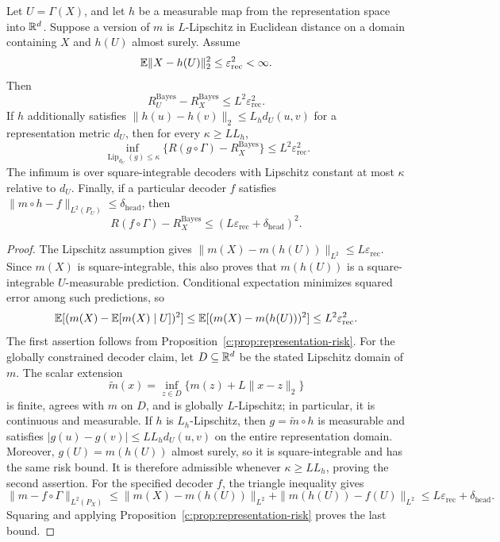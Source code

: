\begin{proposition}
\label{c:prop:reconstruction-bridge}
Let $U=\Gamma(X)$, and let $h$ be a measurable map from the representation
space into $\mathbb{R}^d$. Suppose a version of $m$ is $L$-Lipschitz in Euclidean
distance on a domain containing $X$ and $h(U)$ almost surely. Assume
\[
 \mathbb{E}\|X-h(U)\|_2^2\leq\varepsilon_{\mathrm{rec}}^2<\infty.
\]
Then
\[
 R_U^{\mathrm{Bayes}}-R_X^{\mathrm{Bayes}}
 \leq L^2\varepsilon_{\mathrm{rec}}^2.
\]
If $h$ additionally satisfies
$\|h(u)-h(v)\|_2\leq L_h d_U(u,v)$ for a representation metric $d_U$,
then for every $\kappa\geq LL_h$,
\[
 \inf_{\operatorname{Lip}_{d_U}(g)\leq\kappa}
 \{R(g\circ\Gamma)-R_X^{\mathrm{Bayes}}\}
 \leq L^2\varepsilon_{\mathrm{rec}}^2.
\]
The infimum is over square-integrable decoders with Lipschitz constant at
most $\kappa$ relative to $d_U$. Finally, if a particular decoder $f$
satisfies
$\|m\circ h-f\|_{L^2(P_U)}\leq\delta_{\mathrm{head}}$, then
\[
 R(f\circ\Gamma)-R_X^{\mathrm{Bayes}}
 \leq(L\varepsilon_{\mathrm{rec}}+\delta_{\mathrm{head}})^2.
\]
\end{proposition}
\begin{proof}
The Lipschitz assumption gives
$\|m(X)-m(h(U))\|_{L^2}\leq L\varepsilon_{\mathrm{rec}}$.
Since $m(X)$ is square-integrable, this also proves that $m(h(U))$ is
a square-integrable $U$-measurable prediction. Conditional expectation
minimizes squared error among such predictions, so
\[
 \mathbb{E}[(m(X)-\mathbb{E}[m(X)\mid U])^2]
 \leq\mathbb{E}[(m(X)-m(h(U)))^2]
 \leq L^2\varepsilon_{\mathrm{rec}}^2.
\]
The first assertion follows from
Proposition~\ref{c:prop:representation-risk}. For the globally constrained
decoder claim, let $D\subseteq\mathbb{R}^d$ be the stated Lipschitz domain of $m$.
The scalar extension
\[
 \widetilde m(x)=\inf_{z\in D}\{m(z)+L\|x-z\|_2\}
\]
is finite, agrees with $m$ on $D$, and is globally $L$-Lipschitz;
in particular, it is continuous and measurable. If $h$ is
$L_h$-Lipschitz, then $g=\widetilde m\circ h$ is measurable and satisfies
$|g(u)-g(v)|\leq LL_h d_U(u,v)$ on the entire representation domain.
Moreover, $g(U)=m(h(U))$ almost surely, so it is square-integrable and
has the same risk bound. It is therefore admissible whenever
$\kappa\geq LL_h$, proving the second assertion. For the specified
decoder $f$, the triangle inequality gives
\[
 \|m-f\circ\Gamma\|_{L^2(P_X)}
 \leq\|m(X)-m(h(U))\|_{L^2}
      +\|m(h(U))-f(U)\|_{L^2}
 \leq L\varepsilon_{\mathrm{rec}}+\delta_{\mathrm{head}}.
\]
Squaring and applying Proposition~\ref{c:prop:representation-risk}
proves the last bound.
\end{proof}

